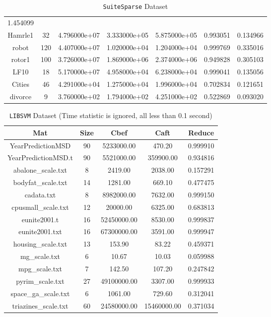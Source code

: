 \begin{table}[h]
\begin{tabular}{ccccccc}
    1.454099\\
    Hamrle1 & 32 & 4.796000e+07 & 3.333000e+05 & 5.875000e+05 & 0.993051 &
    0.134966\\
    robot & 120 & 4.407000e+07 & 1.020000e+04 & 1.204000e+04 & 0.999769 &
    0.335016\\
    rotor1 & 100 & 3.726000e+07 & 1.869000e+06 & 2.374000e+06 & 0.949828 &
    0.305103\\
    LF10 & 18 & 5.170000e+07 & 4.958000e+04 & 6.238000e+04 & 0.999041 &
    0.135056\\
    Cities & 46 & 4.291000e+04 & 1.275000e+04 & 1.996000e+04 & 0.702834 &
    0.121651\\
    divorce & 9 & 3.760000e+02 & 1.794000e+02 & 4.251000e+02 & 0.522869 &
    0.093020\\
    \hline
  \end{tabular}
  \caption{\texttt{SuiteSparse} Dataset}
\end{table}

\begin{table}[h]
\centering
  \begin{tabular}{ccccc}
    \hline
    Mat & Size & Cbef & Caft & Reduce\\
    \hline
    YearPredictionMSD & 90 & 5233000.00 & 470.20 & 0.999910\\
    YearPredictionMSD.t & 90 & 5521000.00 & 359900.00 & 0.934816\\
    abalone\_scale.txt & 8 & 2419.00 & 2038.00 & 0.157291\\
    bodyfat\_scale.txt & 14 & 1281.00 & 669.10 & 0.477475\\
    cadata.txt & 8 & 8982000.00 & 7632.00 & 0.999150\\
    cpusmall\_scale.txt & 12 & 20000.00 & 6325.00 & 0.683813\\
    eunite2001.t & 16 & 52450000.00 & 8530.00 & 0.999837\\
    eunite2001.txt & 16 & 67300000.00 & 3591.00 & 0.999947\\
    housing\_scale.txt & 13 & 153.90 & 83.22 & 0.459371\\
    mg\_scale.txt & 6 & 10.67 & 10.03 & 0.059988\\
    mpg\_scale.txt & 7 & 142.50 & 107.20 & 0.247842\\
    pyrim\_scale.txt & 27 & 49100000.00 & 3307.00 & 0.999933\\
    space\_ga\_scale.txt & 6 & 1061.00 & 729.60 & 0.312041\\
    triazines\_scale.txt & 60 & 24580000.00 & 15460000.00 & 0.371034\\
    \hline
  \end{tabular}
  \caption{\texttt{LIBSVM} Dataset (Time statistic is ignored, all less
  than 0.1 second)}
\end{table}

